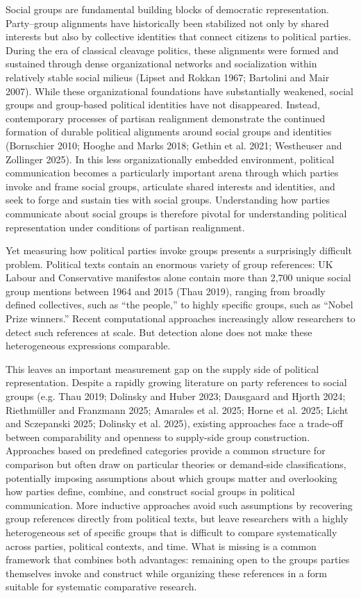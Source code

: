 \documentclass[12pt]{article}
\begin{document}
Social groups are fundamental building blocks of democratic representation. 
Party--group alignments have historically been stabilized not only by shared interests but also by collective identities that connect citizens to political parties. 
During the era of classical cleavage politics, these alignments were formed and sustained through dense organizational networks and socialization within relatively stable social milieus (Lipset and Rokkan 1967; Bartolini and Mair 2007). 
While these organizational foundations have substantially weakened, social groups and group-based political identities have not disappeared. 
Instead, contemporary processes of partisan realignment demonstrate the continued formation of durable political alignments around social groups and identities (Bornschier 2010; Hooghe and Marks 2018; Gethin et al. 2021; Westheuser and Zollinger 2025). 
In this less organizationally embedded environment, political communication becomes a particularly important arena through which parties invoke and frame social groups, articulate shared interests and identities, and seek to forge and sustain ties with social groups. 
Understanding how parties communicate about social groups is therefore pivotal for understanding political representation under conditions of partisan realignment.

Yet measuring how political parties invoke groups presents a surprisingly difficult problem.
Political texts contain an enormous variety of group references: UK Labour and Conservative manifestos alone contain more than 2,700 unique social group mentions between 1964 and 2015 (Thau 2019), ranging from broadly defined collectives, such as ``the people,'' to highly specific groups, such as ``Nobel Prize winners.''
Recent computational approaches increasingly allow researchers to detect such references at scale.
But detection alone does not make these heterogeneous expressions comparable. 

This leaves an important measurement gap on the supply side of political representation.
Despite a rapidly growing literature on party references to social groups (e.g. Thau 2019; Dolinsky and Huber 2023; Dausgaard and Hjorth 2024; Riethmüller and Franzmann 2025; Amarales et al. 2025; Horne et al. 2025; Licht and Sczepanski 2025; Dolinsky et al. 2025), existing approaches face a trade-off between comparability and openness to supply-side group construction. 
Approaches based on predefined categories provide a common structure for comparison but often draw on particular theories or demand-side classifications, potentially imposing assumptions about which groups matter and overlooking how parties define, combine, and construct social groups in political communication. 
More inductive approaches avoid such assumptions by recovering group references directly from political texts, but leave researchers with a highly heterogeneous set of specific groups that is difficult to compare systematically across parties, political contexts, and time.
What is missing is a common framework that combines both advantages: remaining open to the groups parties themselves invoke and construct while organizing these references in a form suitable for systematic comparative research.
\end{document}
